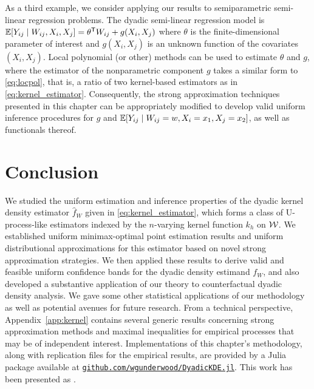 As a third example, we consider applying our results to semiparametric
semi-linear regression problems. The dyadic semi-linear regression model is
$\mathbb{E}[Y_{i j} \mid W_{i j}, X_i, X_j] = \theta^{\mathsf{T}} W_{i j} + g(X_i, X_j)$
where $\theta$ is the finite-dimensional parameter of interest
and $g(X_i, X_j)$ is an unknown function of the covariates $(X_i, X_j)$.
Local polynomial (or other) methods can be used to estimate $\theta$ and $g$,
where the estimator of the nonparametric component $g$ takes a similar form to
\eqref{eq:locpol}, that is, a ratio of two kernel-based estimators as in
\eqref{eq:kernel_estimator}. Consequently, the strong approximation techniques
presented in this chapter can be appropriately modified to develop valid
uniform inference procedures for $g$ and
$\mathbb{E}[Y_{i j} \mid W_{i j}=w, X_i=x_1, X_j=x_2]$, as well as functionals thereof.

\section{Conclusion}
\label{sec:conclusion}

We studied the uniform estimation and inference properties of the dyadic kernel
density estimator $\hat{f}_W$ given in \eqref{eq:kernel_estimator}, which forms
a class of U-process-like estimators indexed by the $n$-varying kernel function
$k_h$ on $\mathcal{W}$. We established uniform minimax-optimal point estimation results
and uniform distributional approximations for this estimator based on novel
strong approximation strategies. We then applied these results to derive valid
and feasible uniform confidence bands for the dyadic density estimand $f_W$,
and also developed a substantive application of our theory to counterfactual
dyadic density analysis. We gave some other statistical applications of our
methodology as well as potential avenues for future research. From a technical
perspective, Appendix~\ref{app:kernel} contains several generic results
concerning strong approximation methods and maximal inequalities for empirical
processes that may be of independent interest. Implementations of this
chapter's methodology, along with replication files for the empirical results,
are provided by a Julia package available at
\href{https://github.com/WGUNDERWOOD/DyadicKDE.jl}%
{\texttt{github.com/wgunderwood/DyadicKDE.jl}}. This work has been presented as
%
\cite{cattaneo2022talkgeorgia,cattaneo2022talkcolumbia,feng2022talkrenmin,%
feng2022talkxiamen, feng2023talkpeking, feng2023talksingapore}.
